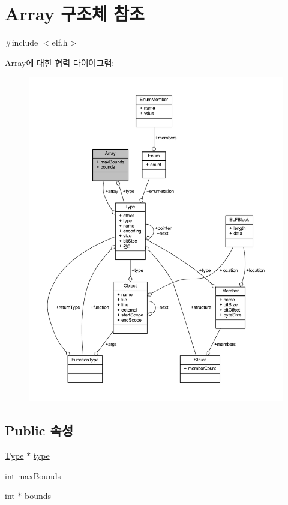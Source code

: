 \hypertarget{struct_array}{}\section{Array 구조체 참조}
\label{struct_array}


{\ttfamily \#include $<$elf.\+h$>$}



Array에 대한 협력 다이어그램\+:\nopagebreak
\begin{figure}[H]
\begin{center}
\leavevmode
\includegraphics[width=350pt]{struct_array__coll__graph}
\end{center}
\end{figure}
\subsection*{Public 속성}
\begin{DoxyCompactItemize}
\item 
\mbox{\hyperlink{struct_type}{Type}} $\ast$ \mbox{\hyperlink{struct_array_aebd7ba43475f7f6461e4343a7ffce0a7}{type}}
\item 
\mbox{\hyperlink{_util_8cpp_a0ef32aa8672df19503a49fab2d0c8071}{int}} \mbox{\hyperlink{struct_array_ac416f8022b0d22cb470b0e5cc1e9b356}{max\+Bounds}}
\item 
\mbox{\hyperlink{_util_8cpp_a0ef32aa8672df19503a49fab2d0c8071}{int}} $\ast$ \mbox{\hyperlink{struct_array_a2d2cd201a0203a12d6f5e7b8a34ab1ad}{bounds}}
\end{DoxyCompactItemize}


